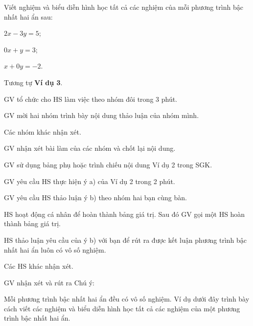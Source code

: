 \begin{luyentap}
    Viết nghiệm và biểu diễn hình học tất cả các nghiệm của mỗi phương trình bậc nhất hai ẩn sau:
    \begin{listEX}
        \item $2x - 3y = 5$;
        \item $0x + y = 3$;
        \item $x + 0y = -2$.
    \end{listEX}
    \doicot
    Tương tự \textbf{Ví dụ 3}.		
\end{luyentap}

\tochucthuchien

\begin{tcth}[luyentap=1]
    \buocmot
    \item GV tổ chức cho HS làm việc theo nhóm đôi trong 3 phút. 
    \buochai
    \item GV mời hai nhóm trình bày nội dung thảo luận của nhóm mình.
    \buocba
    \item Các nhóm khác nhận xét.
    \buocbon
    \item GV nhận xét bài làm của các nhóm và chốt lại nội dung.
\end{tcth}

\begin{tcth}[vidu=2]
    \buocmot
    \item GV sử dụng bảng phụ hoặc trình chiếu nội dung Ví dụ 2 trong SGK. 
    \item GV yêu cầu HS thực hiện ý a) của Ví dụ 2 trong 2 phút.
    \item GV yêu cầu HS thảo luận ý b) theo nhóm hai bạn cùng bàn.
    \buochai
    \item HS hoạt động cá nhân để hoàn thành bảng giá trị. Sau đó GV
    gọi một HS hoàn thành bảng giá trị.
    \item HS thảo luận yêu cầu của ý b)	với bạn để rút ra được kết luận phương trình bậc nhất hai ẩn luôn có vô số nghiệm.
    \buocba
    \item Các HS khác nhận xét.
    \buocbon
    \item GV nhận xét và rút ra Chú ý:
    \begin{chuy}
        Mỗi phương trình bậc nhất hai ẩn đều có vô số nghiệm. Ví dụ dưới đây trình bày cách viết các nghiệm và biểu diễn hình học tất cả các nghiệm của một phương trình bậc nhất hai ẩn.
    \end{chuy}
\end{tcth}

